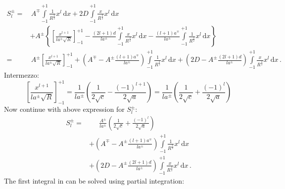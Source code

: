 \begin{align}
    S^{\pm}_l
  =&\, A^{\mp} \int\limits_{-1}^{+1}
              \frac{1}{R^{\frac{3}{2}}} x^l \,\mathrm{d}x
  + 2 D     \int\limits_{-1}^{+1}
              \frac{x}{R^{\frac{3}{2}}} x^l \,\mathrm{d}x \nonumber \\
  ~& + A^{\pm} \left\{
         \left[ \frac{x^{l+1}}{l a^{\pm} \sqrt{R}} \right]_{-1}^{+1}
       - \frac{(2l+1)d}{l a^{\pm}}      \int\limits_{-1}^{+1} \frac{x}{R^\frac{3}{2}} x^l \,\mathrm{d}x
       - \frac{(l+1)a^{\mp}}{l a^{\pm}} \int\limits_{-1}^{+1} \frac{1}{R^\frac{3}{2}} x^l \,\mathrm{d}x
       \right\} \nonumber \\
  =&\, A^{\pm} \left[ \frac{x^{l+1}}{l a^{\pm} \sqrt{R}} \right]_{-1}^{+1}
  + \left( A^{\mp} - A^{\pm} \frac{(l+1)a^{\mp}}{l a^{\pm}} \right) \int\limits_{-1}^{+1} \frac{1}{R^\frac{3}{2}} x^l \,\mathrm{d}x
  + \left( 2 D     - A^{\pm} \frac{(2l+1)d}{l a^{\pm}}      \right) \int\limits_{-1}^{+1} \frac{x}{R^\frac{3}{2}} x^l \,\mathrm{d}x \, . \nonumber
\end{align}
Intermezzo:
\begin{equation}
    \left[ \frac{x^{l+1}}{l a^{\pm} \sqrt{R}} \right]_{-1}^{+1}
  = \frac{1}{l a^{\pm}}\left( \frac{1}{2 \sqrt{c}} - \frac{(-1)^{l+1}}{2 \sqrt{a}} \right)
  = \frac{1}{l a^{\pm}}\left( \frac{1}{2 \sqrt{c}} + \frac{(-1)^l    }{2 \sqrt{a}} \right)
\end{equation}
Now continue with above expression for $S^{\pm}_l$:
\begin{align}
  S^{\pm}_l
  =& \phantom{+}~ \frac{A^{\pm}}{l a^{\pm}}\left( \frac{1}{2 \sqrt{c}} + \frac{(-1)^l    }{2 \sqrt{a}} \right) \nonumber \\
  ~&          +   \left( A^{\mp} - A^{\pm} \frac{(l+1)a^{\mp}}{l a^{\pm}} \right) \int\limits_{-1}^{+1} \frac{1}{R^\frac{3}{2}} x^l \,\mathrm{d}x \nonumber \\
  ~&          +   \left( 2 D     - A^{\pm} \frac{(2l+1)d}{l a^{\pm}}      \right) \int\limits_{-1}^{+1} \frac{x}{R^\frac{3}{2}} x^l \,\mathrm{d}x \, . \label{eqn:S_pm_l_full}
\end{align}
The first integral in  can be solved using partial integration:
